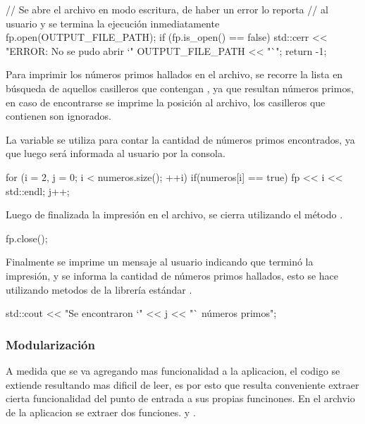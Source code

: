 \documentclass[12pt]{article}
\newenvironment{fullgrayverb}
{\verbbox}
{\endverbbox\par\colorbox{gray!25}{\parbox{\textwidth}{\theverbbox}}\par}
\begin{document}
\begin{fullgrayverb}[\mbox{}]
// Se abre el archivo en modo escritura, de haber un error lo reporta
// al usuario y se termina la ejecución inmediatamente
fp.open(OUTPUT_FILE_PATH);
if (fp.is_open() == false) {
    std::cerr << "ERROR: No se pudo abrir `" OUTPUT_FILE_PATH << "`\n";
    return -1;
}
\end{fullgrayverb}

Para imprimir los números primos hallados en el archivo, se recorre la lista en
búsqueda de aquellos casilleros que contengan , ya que resultan
números primos, en caso de encontrarse se imprime la posición al archivo, los
casilleros que contienen  son ignorados. 

La variable  se utiliza para contar la cantidad de números primos
encontrados, ya que luego será informada al usuario por la consola.

\begin{fullgrayverb}[\mbox{}]
for (i = 2, j = 0; i < numeros.size(); ++i) {
    if(numeros[i] == true) {
        fp << i << std::endl;
        j++;
    }
}
\end{fullgrayverb}

Luego de finalizada la impresión en el archivo, se cierra utilizando el método
.

\begin{fullgrayverb}[\mbox{}]
fp.close();
\end{fullgrayverb}

\pagebreak
Finalmente se imprime un mensaje al usuario indicando que terminó la impresión,
y se informa la cantidad de números primos hallados, esto se hace utilizando
metodos de la librería estándar .

\begin{fullgrayverb}[\mbox{}]
std::cout << "Se encontraron `" << j << "` números primos\n";
\end{fullgrayverb}

\subsubsection{Modularización}

A medida que se va agregando mas funcionalidad a la aplicacion, el codigo se
extiende resultando mas dificil de leer, es por esto que resulta conveniente
extraer cierta funcionalidad del punto de entrada  a sus propias
funcinones. En el archvio  de la aplicacion se extraer dos
funciones.  y .
\end{document}
